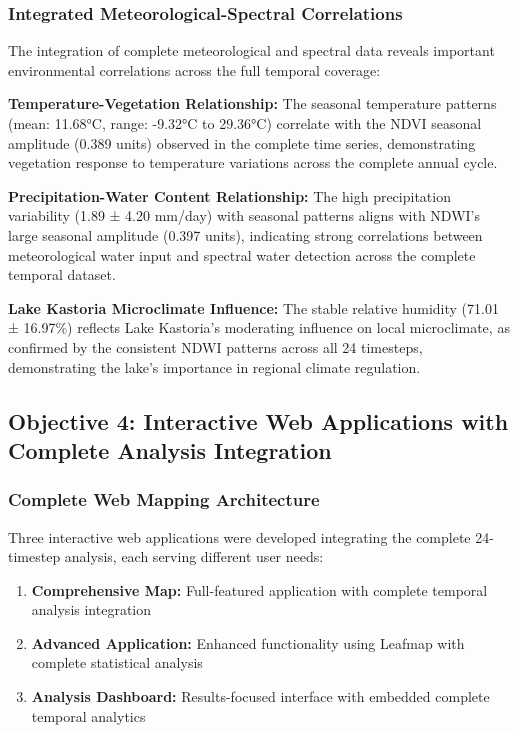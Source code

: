 \documentclass[a4paper,12pt]{article}
\begin{document}
\subsubsection{Integrated Meteorological-Spectral Correlations}

The integration of complete meteorological and spectral data reveals important
environmental correlations across the full temporal coverage:

\textbf{Temperature-Vegetation Relationship:} The seasonal temperature patterns
(mean: 11.68°C, range: -9.32°C to 29.36°C) correlate with the NDVI seasonal amplitude
(0.389 units) observed in the complete time series, demonstrating vegetation response
to temperature variations across the complete annual cycle.

\textbf{Precipitation-Water Content Relationship:} The high precipitation variability
(1.89 ± 4.20 mm/day) with seasonal patterns aligns with NDWI's large seasonal amplitude
(0.397 units), indicating strong correlations between meteorological water input and
spectral water detection across the complete temporal dataset.

\textbf{Lake Kastoria Microclimate Influence:} The stable relative humidity (71.01 ± 16.97\%)
reflects Lake Kastoria's moderating influence on local microclimate, as confirmed by
the consistent NDWI patterns across all 24 timesteps, demonstrating the lake's
importance in regional climate regulation.

\subsection{Objective 4: Interactive Web Applications with Complete Analysis Integration}

\subsubsection{Complete Web Mapping Architecture}

Three interactive web applications were developed integrating the complete 24-timestep analysis,
each serving different user needs:

\begin{enumerate}
    \item \textbf{Comprehensive Map:} Full-featured application with complete temporal analysis integration
    \item \textbf{Advanced Application:} Enhanced functionality using Leafmap with complete statistical analysis
    \item \textbf{Analysis Dashboard:} Results-focused interface with embedded complete temporal analytics
\end{enumerate}
\end{document}
